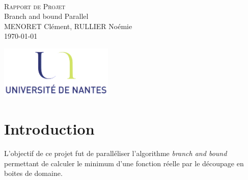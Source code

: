 \documentclass[a4paper,10pt]{article}
\begin{document}
\fancyhead[LE,CE,RE,LO,CO,RO]{}
\fancyfoot[LE,CE,RE,LO,CO,RO]{}
\renewcommand{\headrulewidth}{0.4pt}
\renewcommand{\footrulewidth}{0.4pt}

\begin{titlepage}

\vspace*{\fill}~
\begin{center}
{\large \textsc{Rapport de Projet}} \\
\vspace{1cm}
{\LARGE Branch and bound Parallel} \\
\vspace{1cm}
MENORET Clément, RULLIER Noémie \\
\today
\end{center}
\vspace*{\fill}

\begin{center}
\noindent 
\includegraphics[height=2.5cm]{Images/universite.png}
\end{center}
\pagebreak
\end{titlepage}

\newpage
\tableofcontents 

\newpage
\pagestyle{fancy}

\section{Introduction}
L'objectif de ce projet fut de paralléliser l'algorithme \emph{branch and bound} permettant de calculer le minimum d'une fonction réelle par le découpage en boites de domaine.
\end{document}
